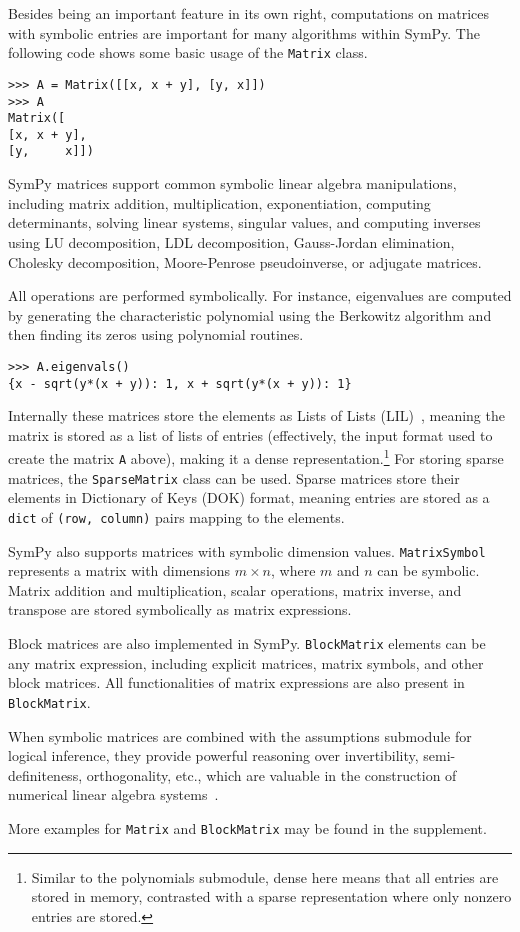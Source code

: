 Besides being an important feature in its own right, computations on
matrices with symbolic entries are important for many algorithms
within SymPy.  The following code shows some basic usage of the
\texttt{Matrix} class.
\begin{verbatim}
>>> A = Matrix([[x, x + y], [y, x]])
>>> A
Matrix([
[x, x + y],
[y,     x]])
\end{verbatim}

SymPy matrices support common symbolic linear algebra manipulations, including
matrix addition, multiplication, exponentiation, computing determinants,
solving linear systems, singular values, and computing inverses using LU
decomposition, LDL decomposition, Gauss-Jordan elimination, Cholesky
decomposition, Moore-Penrose pseudoinverse, or adjugate matrices.

All operations are performed symbolically. For instance, eigenvalues are computed
by generating the characteristic polynomial using the Berkowitz algorithm and
then finding its zeros using polynomial routines.

\begin{verbatim}
>>> A.eigenvals()
{x - sqrt(y*(x + y)): 1, x + sqrt(y*(x + y)): 1}
\end{verbatim}

Internally these matrices store the elements as Lists of Lists (LIL)~\cite{scipy}, meaning
the matrix is stored as a list of lists of entries (effectively, the
input format used to create the matrix \texttt{A} above), making it a
dense representation.\footnote{Similar to the polynomials submodule, dense here
  means that all entries are stored in memory, contrasted with a sparse
  representation where only nonzero entries are stored.} For storing sparse
matrices, the \verb|SparseMatrix| class can be used. Sparse matrices store
their elements in Dictionary of Keys (DOK) format, meaning entries are stored
as a \texttt{dict} of \texttt{(row, column)} pairs mapping to the elements.

SymPy also supports matrices with symbolic dimension values. \verb|MatrixSymbol|
represents a matrix with dimensions $m\times n$, where $m$ and $n$ can be
symbolic. Matrix addition and multiplication, scalar operations, matrix inverse,
and transpose are stored symbolically as matrix expressions.

Block matrices are also implemented in SymPy. \verb|BlockMatrix| elements can
be any matrix expression, including explicit matrices, matrix symbols, and
other block matrices. All functionalities of matrix expressions are also
present in \verb|BlockMatrix|.

When symbolic matrices are combined with the assumptions submodule for logical
inference, they provide powerful reasoning over invertibility,
semi-definiteness, orthogonality, etc., which are valuable in the construction
of numerical linear algebra systems~\cite{rocklin2013mathematically}.

More examples for \verb|Matrix| and \verb|BlockMatrix| may be found in the
supplement.
